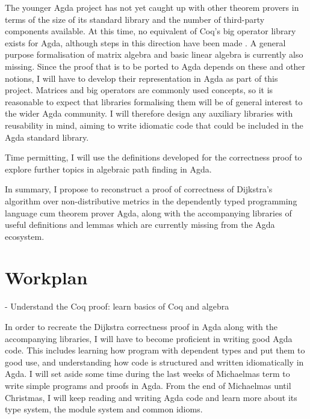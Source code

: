 \documentclass[a4paper]{scrartcl}
\begin{document}
The younger Agda project has not yet caught up with other theorem provers in terms of the size of its standard library and the number of third-party components available. At this time, no equivalent of Coq's big operator library exists for Agda, although steps in this direction have been made \autocite{gustafsson_foldable_2014}. A general purpose formalisation of matrix algebra and basic linear algebra is currently also missing. Since the proof that is to be ported to Agda depends on these and other notions, I will have to develop their representation in Agda as part of this project. Matrices and big operators are commonly used concepts, so it is reasonable to expect that libraries formalising them will be of general interest to the wider Agda community. I will therefore design any auxiliary libraries with reusability in mind, aiming to write idiomatic code that could be included in the Agda standard library.

Time permitting, I will use the definitions developed for the correctness proof to explore further topics in algebraic path finding in Agda.

In summary, I propose to reconstruct a proof of correctness of Dijkstra's algorithm over non-distributive metrics in the dependently typed programming language cum theorem prover Agda, along with the accompanying libraries of useful definitions and lemmas which are currently missing from the Agda ecosystem.

\section{Workplan%
  \label{workplan}%
}

- Understand the Coq proof: learn basics of Coq and algebra

In order to recreate the Dijkstra correctness proof in Agda along with the accompanying libraries, I will have to become proficient in writing good Agda code. This includes learning how program with dependent types and put them to good use, and understanding how code is structured and written idiomatically in Agda. I will set aside some time during the last weeks of Michaelmas term to write simple programs and proofs in Agda. From the end of Michaelmas until Christmas, I will keep reading and writing Agda code and learn more about its type system, the module system and common idioms.

\end{document}
